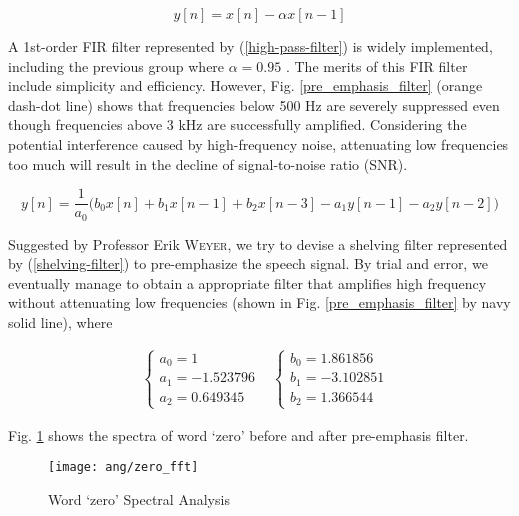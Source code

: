 \begin{equation}
\label{high-pass-filter}
y[n] = x[n] - \alpha x[n-1]
\end{equation}

A 1st-order FIR filter represented by (\ref{high-pass-filter}) is widely implemented, including the previous group where $\alpha = 0.95$ \cite{EVW-report}. The merits of this FIR filter include simplicity and efficiency. However, Fig. \ref{pre_emphasis_filter} (\textcolor{orange_matlab}{orange} dash-dot line) shows that frequencies below 500 Hz are severely suppressed even though frequencies above 3 kHz are successfully amplified. Considering the potential interference caused by high-frequency noise, attenuating low frequencies too much will result in the decline of signal-to-noise ratio (SNR).

\begin{equation}
\label{shelving-filter}
y[n] = \frac{1}{a_0} \Big( b_0 x[n] + b_1 x[n-1] + b_2 x[n-3] - a_1 y[n-1] - a_2 y[n-2] \Big)
\end{equation}

Suggested by Professor Erik \textsc{Weyer}, we try to devise a shelving filter represented by (\ref{shelving-filter}) to pre-emphasize the speech signal. By trial and error, we eventually manage to obtain a appropriate filter that amplifies high frequency without attenuating low frequencies (shown in Fig. \ref{pre_emphasis_filter} by \textcolor{navy_matlab}{navy} solid line), where

\begin{align}
\label{shleving-coef}
&\begin{cases}
a_0 = 1\\
a_1 = -1.523796\\
a_2 = 0.649345
\end{cases}
&\begin{cases}
b_0 = 1.861856\\
b_1 = -3.102851\\
b_2 = 1.366544
\end{cases}
\end{align}

Fig. \ref{zero_fft} shows the spectra of word `zero' before and after pre-emphasis filter.

\begin{figure}[H]
\centering
\texttt{[image: ang/zero\_fft]}
\caption{Word `zero' Spectral Analysis}
\label{zero_fft}
\end{figure}


